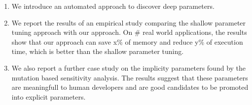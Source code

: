 \begin{enumerate}

\item We introduce an automated approach to discover deep parameters. 

\item We report the results of an empirical study comparing the shallow parameter tuning approach with our approach. On \# real world applications, the results show that our approach can save x\% of memory and reduce y\% of execution time, which is better than the shallow parameter tuning. 

\item We also report a further case study on the implicity parameters found by the mutation based sensitivity analysis. The results suggest that these parameters are meaningfull to human developers and are good candidates to be promoted into explicit parameters. 

\end{enumerate}




